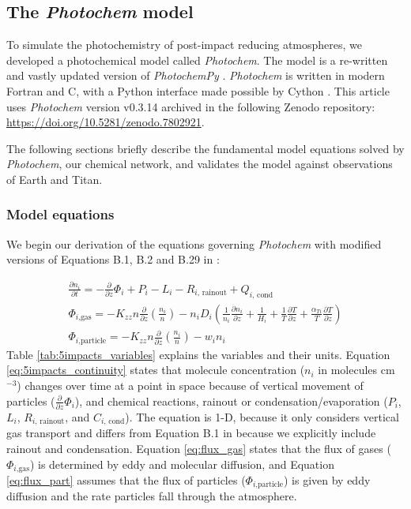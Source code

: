 \subsection{The \emph{Photochem} model} \label{sec:photochem_model}

To simulate the photochemistry of post-impact reducing atmospheres, we developed a photochemical model called \emph{Photochem}. The model is a re-written and vastly updated version of \emph{PhotochemPy} \citep{Wogan_2022}. \emph{Photochem} is written in modern Fortran and C, with a Python interface made possible by Cython \citep{Behnel_2010}. This article uses \emph{Photochem} version v0.3.14 archived in the following Zenodo repository: \url{https://doi.org/10.5281/zenodo.7802921}.

The following sections briefly describe the fundamental model equations solved by \emph{Photochem}, our chemical network, and validates the model against observations of Earth and Titan.

\subsubsection{Model equations}

We begin our derivation of the equations governing \emph{Photochem} with modified versions of Equations B.1, B.2 and B.29 in \citet{Catling_2017}:

\begin{gather}
  \frac{\partial n_{i}}{\partial t} = - \frac{\partial}{\partial z}\Phi_{i} + P_{i} - L_{i} - R_{i\text{, rainout}} + Q_{i\text{, cond}} \label{eq:5impacts_continuity} 
  \\
  \Phi_{i\text{,gas}} = - K_{zz} n\frac{\partial}{\partial z}\left( \frac{n_{i}}{n} \right) - n_i D_{i} \left( \frac{1}{n_i} \frac{\partial n_i}{\partial z} + \frac{1}{H_i} + \frac{1}{T} \frac{\partial T}{\partial z}  + \frac{\alpha_{Ti}}{T} \frac{\partial T}{\partial z} \right) \label{eq:flux_gas} 
  \\
  \Phi_{i\text{,particle}} = - K_{zz} n\frac{\partial}{\partial z}\left( \frac{n_{i}}{n} \right) - w_i n_i \label{eq:flux_part}
\end{gather}
Table \ref{tab:5impacts_variables} explains the variables and their units. Equation \eqref{eq:5impacts_continuity} states that molecule concentration ($n_i$ in molecules cm$^{-3}$) changes over time at a point in space because of vertical movement of particles ($\frac{\partial}{\partial z}\Phi_{i}$), and chemical reactions, rainout or condensation/evaporation ($P_{i}$, $L_{i}$, $R_{i\text{, rainout}}$, and $C_{i\text{, cond}}$). The equation is 1-D, because it only considers vertical gas transport and differs from Equation B.1 in \citet{Catling_2017} because we explicitly include rainout and condensation. Equation \eqref{eq:flux_gas} states that the flux of gases ($\Phi_{i\text{,gas}}$) is determined by eddy and molecular diffusion, and Equation \eqref{eq:flux_part} assumes that the flux of particles ($\Phi_{i\text{,particle}}$) is given by eddy diffusion and the rate particles fall through the atmosphere.

